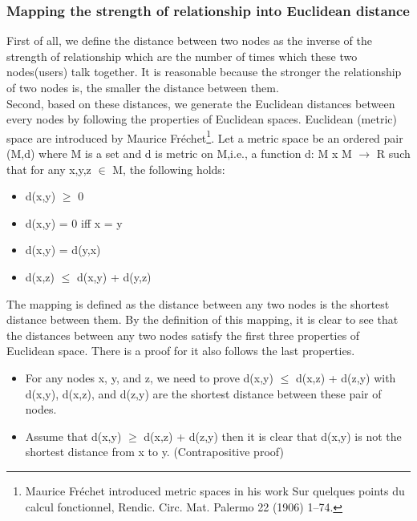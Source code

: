 \documentclass[12pt, letterpaper]{article}
\begin{document}
  \subsubsection{Mapping the strength of relationship into Euclidean distance}
First of all, we define the distance between two nodes as the inverse of
the strength of relationship which are the number of times which these
two nodes(users) talk together. It is reasonable because the stronger
the relationship of two nodes is, the smaller the distance between
them.
\\Second, based on these distances, we generate the Euclidean distances
between every nodes by following the properties of Euclidean
spaces. Euclidean (metric) space are introduced by Maurice Fréchet\footnote{Maurice Fréchet introduced metric spaces in his work Sur quelques points du calcul fonctionnel, Rendic. Circ. Mat. Palermo 22 (1906) 1–74.}. Let
a metric space be an ordered pair (M,d) where M is a set and d is
metric on M,i.e., a function d: M x M $\rightarrow$ R such that for any x,y,z 
$\in$ M, the following holds: 
 \begin{itemize}
    \item d(x,y) $\geq$ 0 
    \item d(x,y) = 0 iff x = y
    \item d(x,y) = d(y,x)
    \item d(x,z) $\leq$ d(x,y) + d(y,z)
  \end{itemize}
The mapping is defined as the distance between any two nodes is the
shortest distance between them. By the definition of this
mapping, it is clear to see that the distances between any two nodes
satisfy the first three properties of Euclidean space. There is a
proof for it also follows the last properties.
  \begin{itemize}
    \item For any nodes x, y, and z, we need to prove d(x,y)  $\leq$
      d(x,z) + d(z,y) with d(x,y), d(x,z), and d(z,y) are the shortest
      distance between these pair of nodes.
    \item Assume that d(x,y) $\geq$ d(x,z) + d(z,y) then it is clear
      that d(x,y) is not the shortest distance from x to
      y. (Contrapositive proof)
  \end{itemize}
\end{document}
